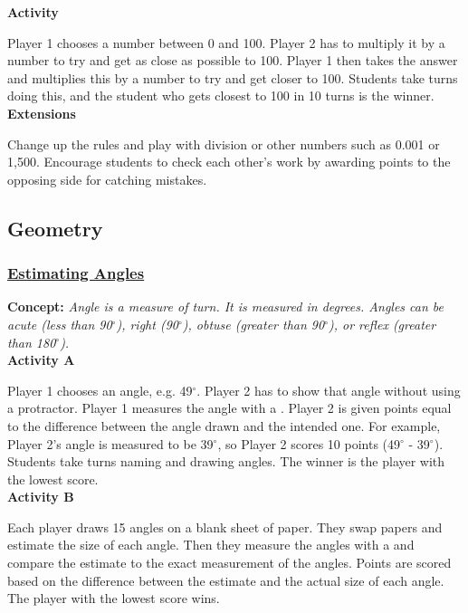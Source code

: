 		\noindent \textbf{Activity}
		
		\noindent Player 1 chooses a number between 0 and 100. Player 2 has to multiply it by a number to try and get as close as possible to 100. Player 1 then takes the answer and multiplies this by a number to try and get closer to 100. Students take turns doing this, and the student who gets closest to 100 in 10 turns is the winner.\\
		
		\noindent \textbf{Extensions}
		
		\noindent Change up the rules and play with division or other numbers such as 0.001 or 1,500. Encourage students to check each other's work by awarding points to the opposing side for catching mistakes.
			
	\subsection{Geometry} \label{classactsgeo}
	
		\subsubsection{\underline{Estimating Angles}}
		\textbf{Concept:} \emph{Angle is a measure of turn. It is measured in degrees. Angles can be acute (less than 90$^\circ$), right (90$^\circ$), obtuse (greater than 90$^\circ$), or reflex (greater than 180$^\circ$).}\\
		
		\noindent \textbf{Activity A}
		
		\noindent Player 1 chooses an angle, e.g. 49$^\circ$. Player 2 has to show that angle without using a protractor. Player 1 measures the angle with a . Player 2 is given points equal to the difference between the angle drawn and the intended one. For example, Player 2's angle is measured to be 39$^\circ$, so Player 2 scores 10 points (49$^\circ$ - 39$^\circ$). Students take turns naming and drawing angles. The winner is the player with the lowest score.\\
		
		\noindent \textbf{Activity B}
		
		\noindent Each player draws 15 angles on a blank sheet of paper. They swap papers and estimate the size of each angle. Then they measure the angles with a  and compare the estimate to the exact measurement of the angles. Points are scored based on the difference between the estimate and the actual size of each angle. The player with the lowest score wins.
		
